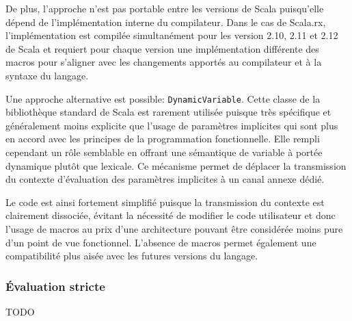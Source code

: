 	De plus, l'approche n'est pas portable entre les versions de Scala puisqu'elle dépend de l'implémentation interne du compilateur. Dans le cas de Scala.rx, l'implémentation est compilée simultanément pour les version 2.10, 2.11 et 2.12 de Scala et requiert pour chaque version une implémentation différente des macros pour s'aligner avec les changements apportés au compilateur et à la syntaxe du langage.
	
	Une approche alternative est possible: \texttt{DynamicVariable}. Cette classe de la bibliothèque standard de Scala est rarement utilisée puisque très spécifique et généralement moins explicite que l'usage de paramètres implicites qui sont plus en accord avec les principes de la programmation fonctionnelle. Elle rempli cependant un rôle semblable en offrant une sémantique de variable à portée dynamique plutôt que lexicale. Ce mécanisme permet de déplacer la transmission du contexte d'évaluation des paramètres implicites à un canal annexe dédié.
	
	Le code est ainsi fortement simplifié puisque la transmission du contexte est clairement dissociée, évitant la nécessité de modifier le code utilisateur et donc l'usage de macros au prix d'une architecture pouvant être considérée moins pure d'un point de vue fonctionnel. L'absence de macros permet également une compatibilité plus aisée avec les futures versions du langage.
	
	\subsubsection{Évaluation stricte}
	
	TODO